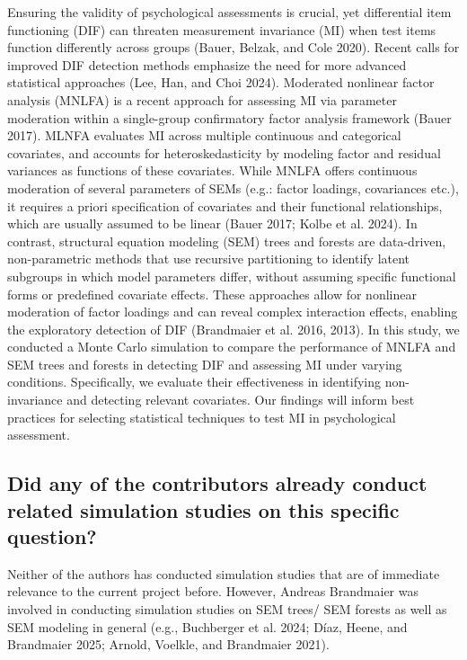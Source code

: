\documentclass[
  man,
  floatsintext]{apa7}
\begin{document}
Ensuring the validity of psychological assessments is crucial, yet
differential item functioning (DIF) can threaten measurement invariance
(MI) when test items function differently across groups (Bauer, Belzak,
and Cole 2020). Recent calls for improved DIF detection methods
emphasize the need for more advanced statistical approaches (Lee, Han,
and Choi 2024). Moderated nonlinear factor analysis (MNLFA) is a recent
approach for assessing MI via parameter moderation within a single-group
confirmatory factor analysis framework (Bauer 2017). MLNFA evaluates MI
across multiple continuous and categorical covariates, and accounts for
heteroskedasticity by modeling factor and residual variances as
functions of these covariates. While MNLFA offers continuous moderation
of several parameters of SEMs (e.g.: factor loadings, covariances etc.),
it requires a priori specification of covariates and their functional
relationships, which are usually assumed to be linear (Bauer 2017; Kolbe
et al. 2024). In contrast, structural equation modeling (SEM) trees and
forests are data-driven, non-parametric methods that use recursive
partitioning to identify latent subgroups in which model parameters
differ, without assuming specific functional forms or predefined
covariate effects. These approaches allow for nonlinear moderation of
factor loadings and can reveal complex interaction effects, enabling the
exploratory detection of DIF (Brandmaier et al. 2016, 2013). In this
study, we conducted a Monte Carlo simulation to compare the performance
of MNLFA and SEM trees and forests in detecting DIF and assessing MI
under varying conditions. Specifically, we evaluate their effectiveness
in identifying non-invariance and detecting relevant covariates. Our
findings will inform best practices for selecting statistical techniques
to test MI in psychological assessment.

\subsection{Did any of the contributors already conduct related
simulation studies on this specific
question?}\label{did-any-of-the-contributors-already-conduct-related-simulation-studies-on-this-specific-question}

Neither of the authors has conducted simulation studies that are of
immediate relevance to the current project before. However, Andreas
Brandmaier was involved in conducting simulation studies on SEM trees/
SEM forests as well as SEM modeling in general (e.g., Buchberger et al.
2024; Díaz, Heene, and Brandmaier 2025; Arnold, Voelkle, and Brandmaier
2021).
\end{document}
